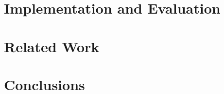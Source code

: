 \documentclass[nocopyrightspace]{sigplanconf}
\begin{document}
\section{\padsd{} Implementation and Evaluation}
\label{sec:implementation}


\section{Related Work}
\label{sec:related}


\section{Conclusions}
\label{sec:conclusions}






\end{document}
